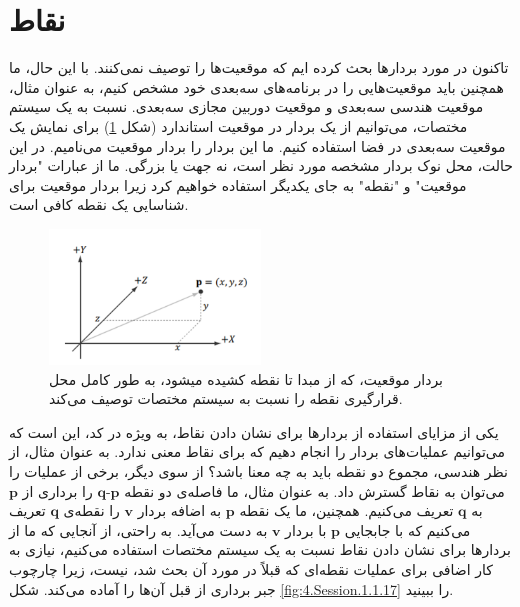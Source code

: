 \section{\textbf{نقاط}}
\label{sec:1.5}
{
    \Large
    \begin{spacing}{1.5}
        تاکنون در مورد بردارها بحث کرده ایم که موقعیت‌ها را توصیف نمی‌کنند.
        با این حال، ما همچنین باید موقعیت‌هایی را در برنامه‌های سه‌بعدی خود مشخص کنیم،
        به عنوان مثال، موقعیت هندسی سه‌بعدی و موقعیت دوربین مجازی سه‌بعدی.
        نسبت به یک سیستم مختصات، می‌توانیم از یک بردار در موقعیت استاندارد (شکل \ref{fig:4.Session.1.1.16}) برای نمایش یک موقعیت سه‌بعدی در فضا استفاده کنیم.
        ما این بردار را بردار موقعیت می‌نامیم.
        در این حالت، محل نوک بردار مشخصه مورد نظر است، نه جهت یا بزرگی.
        ما از عبارات "بردار موقعیت" و "نقطه" به جای یکدیگر استفاده خواهیم کرد زیرا بردار موقعیت برای شناسایی یک نقطه کافی است.

        \begin{figure}[H]
            \centering
            \setlength{\belowcaptionskip}{-10pt}
            \includegraphics[width=0.5\textwidth]{Images/4/1/4.Session.1.1.16}
            \caption {بردار موقعیت، که از مبدا تا نقطه کشیده میشود، به طور کامل محل قرارگیری نقطه را نسبت به سیستم مختصات توصیف می‌کند.}
            \label{fig:4.Session.1.1.16}
        \end{figure}

        یکی از مزایای استفاده از بردارها برای نشان دادن نقاط، به ویژه در کد، این است که می‌توانیم عملیات‌های بردار را انجام دهیم که برای نقاط معنی ندارد.
        به عنوان مثال، از نظر هندسی، مجموع دو نقطه باید به چه معنا باشد؟
        از سوی دیگر، برخی از عملیات را می‌توان به نقاط گسترش داد.
        به عنوان مثال، ما فاصله‌ی دو نقطه $\textbf{q}\textbf{-p}$ را برداری از $\textbf{p}$ به $\textbf{q}$ تعریف می‌کنیم. همچنین، ما یک نقطه $\textbf{p}$ به اضافه بردار $\textbf{v}$ را نقطه‌ی $\textbf{q}$ تعریف می‌کنیم که با جابجایی $\textbf{p}$ با بردار $\textbf{v}$ به دست می‌آید.
        به راحتی، از آنجایی که ما از بردارها برای نشان دادن نقاط نسبت به یک سیستم مختصات استفاده می‌کنیم، نیازی به کار اضافی برای عملیات نقطه‌ای که قبلاً در مورد آن بحث شد، نیست، زیرا چارچوب جبر برداری از قبل آن‌ها را آماده می‌کند. شکل \ref{fig:4.Session.1.1.17} را ببینید.


\end{spacing}}
